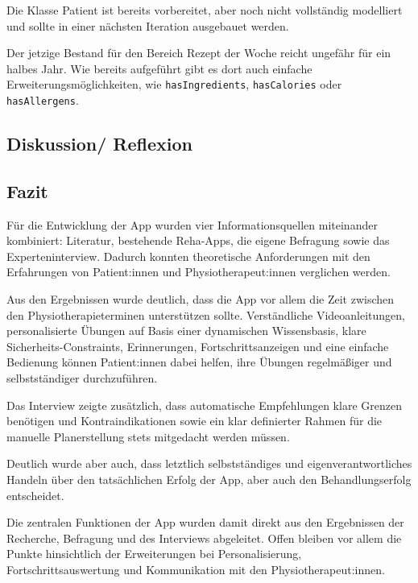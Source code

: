 Die Klasse Patient ist bereits
vorbereitet, aber noch nicht vollständig modelliert und sollte in einer
nächsten Iteration ausgebauet werden.

Der jetzige Bestand für den Bereich Rezept
der Woche reicht ungefähr für ein halbes Jahr. Wie bereits aufgeführt gibt es dort auch einfache Erweiterungsmöglichkeiten, wie \texttt{hasIngredients}, \texttt{hasCalories} oder \texttt{hasAllergens}.

\subsection{Diskussion/ Reflexion}
\subsection{Fazit}

Für die Entwicklung der App wurden vier Informationsquellen miteinander kombiniert: Literatur, bestehende Reha-Apps, die eigene Befragung sowie das Experteninterview. Dadurch konnten theoretische Anforderungen mit den Erfahrungen von Patient:innen und Physiotherapeut:innen verglichen werden.

Aus den Ergebnissen wurde deutlich, dass die App vor allem die Zeit zwischen den Physiotherapieterminen unterstützen sollte. Verständliche Videoanleitungen, personalisierte Übungen auf Basis einer dynamischen Wissensbasis, klare Sicherheits-Constraints, Erinnerungen, Fortschrittsanzeigen und eine einfache Bedienung können Patient:innen dabei helfen, ihre Übungen regelmäßiger und selbstständiger durchzuführen.

Das Interview zeigte zusätzlich, dass automatische Empfehlungen klare Grenzen benötigen und Kontraindikationen sowie ein klar definierter Rahmen für die manuelle Planerstellung stets mitgedacht werden müssen.

Deutlich wurde aber auch, dass letztlich selbstständiges und eigenverantwortliches Handeln über den tatsächlichen Erfolg der App, aber auch den Behandlungserfolg entscheidet.

Die zentralen Funktionen der App wurden damit direkt aus den Ergebnissen der Recherche, Befragung und des Interviews abgeleitet. Offen bleiben vor allem die Punkte hinsichtlich der Erweiterungen bei Personalisierung, Fortschrittsauswertung und Kommunikation mit den Physiotherapeut:innen.